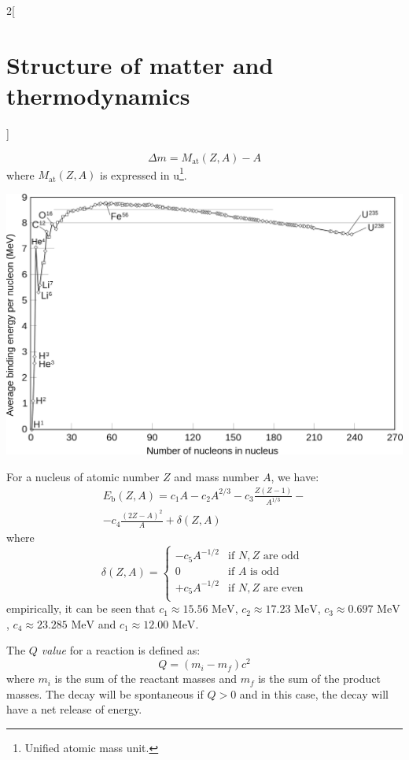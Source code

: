 \documentclass[../../../main_physics.tex]{subfiles}
\begin{document}
\begin{multicols}{2}[\section{Structure of matter and thermodynamics}]
\begin{proposition}
    $$\Delta m=M_\text{at}(Z,A)-A$$ where $M_\text{at}(Z,A)$ is expressed in u\footnote{Unified atomic mass unit.}.
  \end{proposition}
  \begin{center}
    \begin{minipage}{\linewidth}
      \centering
      \includegraphics[width=\linewidth]{Images/Binding_energy.png}
    \end{minipage}
  \end{center}
  \begin{proposition}
    For a nucleus of atomic number $Z$ and mass number $A$, we have:
    \begin{multline*}
      E_\text{b}(Z,A)=c_1A-c_2A^{2/3}-c_3\frac{Z(Z-1)}{A^{1/3}}-\\-c_4\frac{{(2Z-A)}^2}{A}+\delta(Z,A)
    \end{multline*}
    where
    $$\delta(Z,A)=
      \begin{cases}
        -c_5A^{-1/2} & \text{if }N, Z\text{ are odd}  \\
        0            & \text{if }A\text{ is odd}      \\
        +c_5A^{-1/2} & \text{if }N, Z\text{ are even} \\
      \end{cases}
    $$
    empirically, it can be seen that $c_1\approx 15.56\text{ MeV}$, $c_2\approx 17.23\text{ MeV}$, $c_3\approx 0.697\text{ MeV}$, $c_4\approx 23.285\text{ MeV}$ and $c_1\approx 12.00\text{ MeV}$.
  \end{proposition}
  \begin{definition}[Q value]
    The \emph{$Q$ value} for a reaction is defined as: $$Q=(m_i-m_f)c^2$$ where $m_i$ is the sum of the reactant masses and $m_f$ is the sum of the product masses. The decay will be spontaneous if $Q>0$ and in this case, the decay will have a net release of energy.

\end{definition}
\end{multicols}
\end{document}
